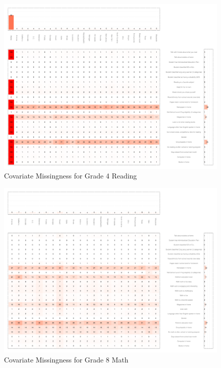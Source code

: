 \begin{figure}[h]
\begin{center}
\includegraphics[width=\textwidth]{../Figures2009/g4read-missing.pdf}
\caption{Covariate Missingness for Grade 4 Reading}
\label{fig:g4reading:missing}
\end{center}
\end{figure}

\begin{figure}[h]
\begin{center}
\includegraphics[width=\textwidth]{../Figures2009/g8math-missing.pdf}
\caption{Covariate Missingness for Grade 8 Math}
\label{fig:g8math:missing}
\end{center}
\end{figure}

